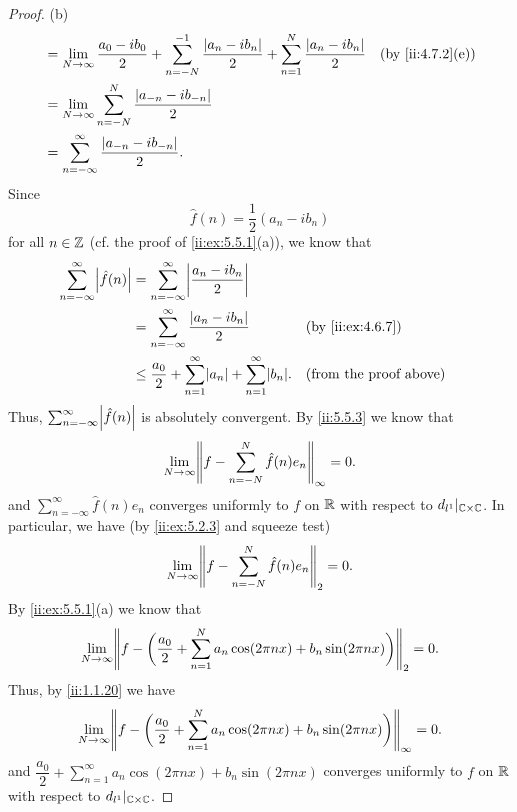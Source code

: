 \begin{proof}{(b)}
\begin{align*}
     & = \lim_{N \to \infty} \dfrac{a_0 - i b_0}{2} + \sum_{n = -N}^{-1} \dfrac{\abs{a_n - i b_n}}{2} + \sum_{n = 1}^N \dfrac{\abs{a_n - i b_n}}{2} &  & \by{ii:4.7.2}[e]       \\
     & = \lim_{N \to \infty} \sum_{n = -N}^N \dfrac{\abs{a_{-n} - i b_{-n}}}{2}                                                                                                 \\
     & = \sum_{n = -\infty}^\infty \dfrac{\abs{a_{-n} - i b_{-n}}}{2}.
  \end{align*}
  Since
  \[
    \hat{f}(n) = \dfrac{1}{2} (a_n - i b_n)
  \]
  for all \(n \in \mathbb{Z}\) (cf. the proof of \cref{ii:ex:5.5.1}(a)), we know that
  \begin{align*}
    \sum_{n = -\infty}^\infty \abs{\hat{f}(n)} & = \sum_{n = -\infty}^\infty \abs{\dfrac{a_n - i b_n}{2}}                                                                \\
                                               & = \sum_{n = -\infty}^\infty \dfrac{\abs{a_n - i b_n}}{2}                             &  & \by{ii:ex:4.6.7}              \\
                                               & \leq \dfrac{a_0}{2} + \sum_{n = 1}^\infty \abs{a_n} + \sum_{n = 1}^\infty \abs{b_n}. &  & \text{(from the proof above)}
  \end{align*}
  Thus, \(\sum_{n = -\infty}^\infty \abs{\hat{f}(n)}\) is absolutely convergent.
  By \cref{ii:5.5.3} we know that
  \[
    \lim_{N \to \infty} \norm*{f - \sum_{n = -N}^N \hat{f}(n) e_n}_{\infty} = 0.
  \]
  and \(\sum_{n = -\infty}^\infty \hat{f}(n) e_n\) converges uniformly to \(f\) on \(\mathbb{R}\) with respect to \(d_{l^1}|_{\mathbb{C} \times \mathbb{C}}\).
  In particular, we have (by \cref{ii:ex:5.2.3} and squeeze test)
  \[
    \lim_{N \to \infty} \norm*{f - \sum_{n = -N}^N \hat{f}(n) e_n}_2 = 0.
  \]
  By \cref{ii:ex:5.5.1}(a) we know that
  \[
    \lim_{N \to \infty} \norm*{f - \bigg(\dfrac{a_0}{2} + \sum_{n = 1}^N a_n \cos(2 \pi n x) + b_n \sin(2 \pi n x)\bigg)}_2 = 0.
  \]
  Thus, by \cref{ii:1.1.20} we have
  \[
    \lim_{N \to \infty} \norm*{f - \bigg(\dfrac{a_0}{2} + \sum_{n = 1}^N a_n \cos(2 \pi n x) + b_n \sin(2 \pi n x)\bigg)}_{\infty} = 0.
  \]
  and \(\dfrac{a_0}{2} + \sum_{n = 1}^\infty a_n \cos(2 \pi n x) + b_n \sin(2 \pi n x)\) converges uniformly to \(f\) on \(\mathbb{R}\) with respect to \(d_{l^1}|_{\mathbb{C} \times \mathbb{C}}\).
\end{proof}

